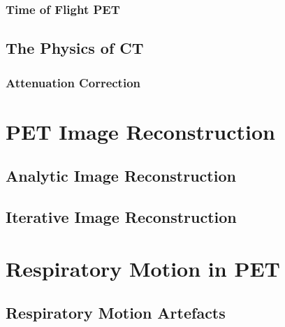             \subsubsection{Time of Flight PET}  \label{time_of_flight_pet}
                \blindtext
        
        \subsection{The Physics of CT} \label{the_physics_of_ct}
            \blindtext
            
            \subsubsection{Attenuation Correction} \label{attenuation_correction}
                \blindtext
    
    \section{PET Image Reconstruction}  \label{pet_image_reconstruction}
        \blindtext
        
        \subsection{Analytic Image Reconstruction}  \label{analytic_image_reconstruction}
            \blindtext
            
        \subsection{Iterative Image Reconstruction}   \label{iterative_image_reconstruction}
            \blindtext
    
    \section{Respiratory Motion in PET}  \label{respiratory_motion_in_pet}
        \blindtext
        
        \subsection{Respiratory Motion Artefacts}   \label{respiratory_motion_artefacts}
            \blindtext
            
